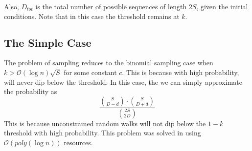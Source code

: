 Also, $D_{tot}$ is the total number of possible sequences of length $2S$, given the initial conditions.
Note that in this case the threshold remains at $k$.

\subsection{The Simple Case}
The problem of sampling reduces to the binomial sampling case when $k > \mathcal{O}(\log n)\sqrt S$ for some constant $c$.
This is because with high probability, will never dip below the threshold.
In this case, the we can simply approximate the probability as
$$
\frac{{{S}\choose{D-d}}\cdot{{S}\choose{D+d}}}{{{2S}\choose{2D}}}
$$
This is because unconstrained random walks will not dip below the $1-k$ threshold with high probability.
This problem was solved in \cite{huge} using $\mathcal O(poly(\log n))$ resources.


